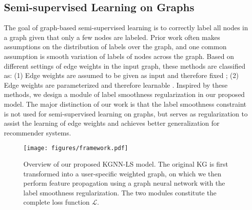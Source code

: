 \documentclass[sigconf]{acmart}
\begin{document}
		
	\subsection{Semi-supervised Learning on Graphs}
		The goal of graph-based semi-supervised learning is to correctly label all nodes in a graph given that only a few nodes are labeled.
		Prior work often makes assumptions on the distribution of labels over the graph, and one common assumption is smooth variation of labels of nodes across the graph.
		Based on different settings of edge weights in the input graph, these methods are classified as:
		(1) Edge weights are assumed to be given as input and therefore fixed \cite{zhu2003semi,zhou2004learning,baluja2008video};
(2) Edge weights are parameterized and therefore learnable \cite{zhang2007hyperparameter,wang2008label,karasuyama2013manifold}.
		Inspired by these methods, we design a module of label smoothness regularization in our proposed model.
		The major distinction of our work is that the label smoothness constraint is not used for semi-supervised learning on graphs, but serves as regularization to assist the learning of edge weights and achieves better generalization for recommender systems.
		
	\begin{figure*}[t]
		\centering
		\texttt{[image: figures/framework.pdf]}
		\caption{Overview of our proposed KGNN-LS model. The original KG is first transformed into a user-specific weighted graph, on which we then perform feature propagation using a graph neural network with the label smoothness regularization. The two modules constitute the complete loss function $\mathcal L$.}
		\label{fig:framework}
	\end{figure*}
		
		
\end{document}

